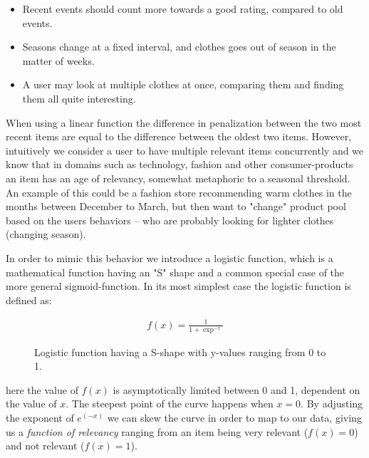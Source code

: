 \begin{itemize}
  \item Recent events should count more towards a good rating, compared to old
  events.
  \item Seasons change at a fixed interval, and clothes goes out of season in
  the matter of weeks.
  \item A user may look at multiple clothes at once, comparing them and finding
  them all quite interesting.
\end{itemize}

When using a linear function the difference in penalization between the two
most recent items are equal to the difference between the oldest two items.
However, intuitively we consider a user to have multiple relevant items
concurrently and we know that in domains such as technology, fashion and other
consumer-products an item has an age of relevancy, somewhat metaphoric to a
seasonal threshold. An example of this could be a fashion store recommending
warm clothes in the months between December to March, but then want to "change"
product pool based on the users behaviors -- who are probably looking for
lighter clothes (changing season).

In order to mimic this behavior we introduce a logistic function, which is a
mathematical function having an "S" shape and a common special case of the more
general sigmoid-function. In its most simplest case the logistic function is
defined as:

\begin{figure}[H]
  \centering
  \noindent\begin{minipage}{.45\textwidth}
  \end{minipage}
  \begin{minipage}{.45\textwidth}
  \begin{align}
    \label{logistic-function}
    f(x) = \frac{1}{1+\exp^{-x}}
  \end{align}
  \end{minipage}
  \caption{Logistic function having a S-shape with y-values ranging
  from 0 to 1.}
\end{figure}

here the value of $f(x)$ is asymptotically limited between 0 and 1, dependent
on the value of $x$. The steepest point of the curve happens when $x=0$. By
adjusting the exponent of $e^{(-x)}$ we can skew the curve in order to map to our
data, giving us a \textit{function of relevancy} ranging from an item being
very relevant ($f(x)=0$) and not relevant ($f(x)=1$).

